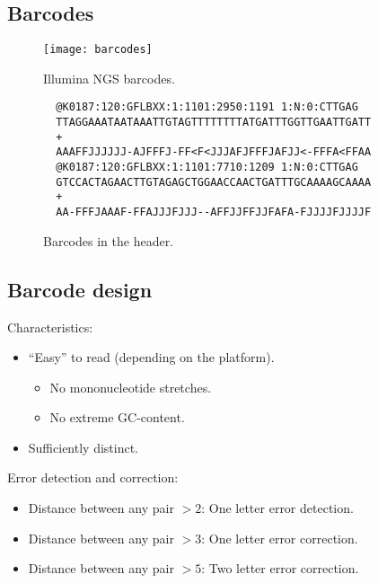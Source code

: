\documentclass[slidestop]{beamer}
\begin{document}
\subsection{Barcodes}
\begin{pframe}
  \begin{figure}[]
    \vspace{-.5cm}
    \begin{center}
      \texttt{[image: barcodes]}
    \end{center}
    \caption{Illumina NGS barcodes.}
  \end{figure}
\end{pframe}

\begin{pframe}
  \begin{figure}[]
    \begin{verbatim}
  @K0187:120:GFLBXX:1:1101:2950:1191 1:N:0:CTTGAG
  TTAGGAAATAATAAATTGTAGTTTTTTTTATGATTTGGTTGAATTGATT
  +
  AAAFFJJJJJJ-AJFFFJ-FF<F<JJJAFJFFFJAFJJ<-FFFA<FFAA
  @K0187:120:GFLBXX:1:1101:7710:1209 1:N:0:CTTGAG
  GTCCACTAGAACTTGTAGAGCTGGAACCAACTGATTTGCAAAAGCAAAA
  +
  AA-FFFJAAAF-FFAJJJFJJJ--AFFJJFFJJFAFA-FJJJJFJJJJF
    \end{verbatim}
    \caption{Barcodes in the header.}
  \end{figure}
\end{pframe}

\subsection{Barcode design}
\begin{pframe}
  Characteristics:
  \begin{itemize}
    \item ``Easy'' to read (depending on the platform).
    \begin{itemize}
      \item No mononucleotide stretches.
      \item No extreme GC-content.
    \end{itemize}
    \item Sufficiently distinct.
  \end{itemize}
  \bigskip
  \pause

  Error detection and correction:
  \begin{itemize}
    \item Distance between any pair $> 2$: One letter error detection.
    \item Distance between any pair $> 3$: One letter error correction.
    \item Distance between any pair $> 5$: Two letter error correction.
  \end{itemize}
  \vfill

\end{pframe}
\end{document}
